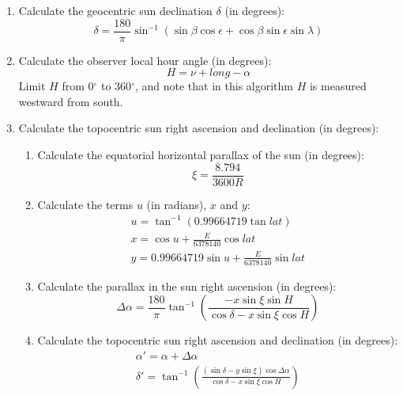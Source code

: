 {\begin{enumerate}
\item Calculate the geocentric sun declination $\delta$ (in degrees):
\begin{displaymath}
\delta = \frac{180}{\pi} \sin^{-1}(\sin{\beta} \cos{\epsilon} + \cos{\beta}\sin{\epsilon}\sin{\lambda})
\end{displaymath}

\item Calculate the observer local hour angle (in degrees):
\begin{displaymath}
  H = \nu + long - \alpha
\end{displaymath}
Limit $H$ from 0$^\circ$ to 360$^\circ$, and note that in this algorithm $H$ is measured westward from south.

\item Calculate the topocentric sun right ascension and declination (in degrees):
  \begin{enumerate}
  \item Calculate the equatorial horizontal parallax of the sun (in degrees):
      \begin{displaymath}
      \xi = \frac{8.794}{3600 R}
      \end{displaymath}
  \item Calculate the terms $u$ (in radians), $x$ and $y$:
      \begin{gather*}
      u = \tan^{-1}(0.99664719 \tan{lat}) \\
      x = \cos{u} + \frac{E}{6378140} \cos{lat} \\
      y = 0.99664719 \sin{u} + \frac{E}{6378140} \sin{lat}
      \end{gather*}
    \item Calculate the parallax in the sun right ascension (in degrees):
      \begin{displaymath}
      \Delta \alpha = \frac{180}{\pi} \tan^{-1}\left(\frac{-x \sin{\xi} \sin{H}}{\cos{\delta} - x \sin{\xi} \cos{H}} \right)
      \end{displaymath}

    \item Calculate the topocentric sun right ascension and declination (in degrees):
      \begin{gather*}
      \alpha' = \alpha + \Delta \alpha \\
      \delta' = \tan^{-1} \left( \frac{(\sin{\delta} - y \sin{\xi}) \cos{\Delta \alpha}}{\cos{\delta} - x \sin{\xi} \cos{H}} \right)
      \end{gather*}
  \end{enumerate}


\end{enumerate}}
